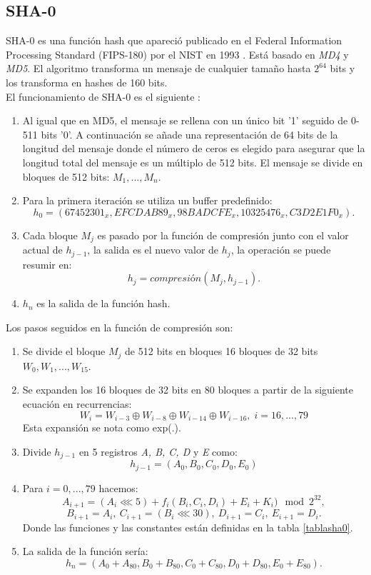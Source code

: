 \begin{aligned*}
\subsection{SHA-0}
SHA-0 es una función hash que apareció publicado en el Federal Information Processing Standard (FIPS-180) por el NIST en 1993 \cite{Penard2008}. Está basado en \emph{MD4} y \emph{MD5}. El algoritmo transforma un mensaje de cualquier tamaño hasta $2^{64}$ bits y los transforma en hashes de 160 bits.\\
El funcionamiento de SHA-0 es el siguiente \cite{sha0}:
\begin{enumerate}
	\item Al igual que en MD5, el mensaje se rellena con un único bit '1' seguido de 0-511 bits '0'. A continuación se añade una representación de 64 bits de la longitud del mensaje donde el número de ceros es elegido para asegurar que la longitud total del mensaje es un múltiplo de 512 bits. El mensaje se divide en bloques de 512 bits: $M_1,...,M_n$.
	\item Para la primera iteración se utiliza un buffer predefinido:
	$$
		h_0=(67452301_x, EFCDAB89_x, 98BADCFE_x, 10325476_x, C3D2E1F0_x).
	$$
	\item Cada bloque $M_j$ es pasado por la función de compresión junto con el valor actual de $h_{j-1}$, la salida es el nuevo valor de $h_j$, la operación se puede resumir en:
	$$
		h_j=compresión(M_j,h_{j-1}).
	$$
	\item $h_n$ es la salida de la función hash.
\end{enumerate}
Los pasos seguidos en la función de compresión son:
\begin{enumerate}
	\item Se divide el bloque $M_j$ de 512 bits en bloques 16 bloques de 32 bits $W_0,W_1,...,W_{15}$. 
	\item Se expanden los 16 bloques de 32 bits en 80 bloques a partir de la siguiente ecuación en recurrencias:
	$$
		W_i=W_{i-3}\oplus W_{i-8}\oplus W_{i-14}\oplus W_{i-16},\; i=16,...,79
	$$
	Esta expansión se nota como exp(.).
	\item Divide $h_{j-1}$ en 5 registros \emph{A, B, C, D} y \emph{E} como:
	$$
		h_{j-1} = (A_0, B_0, C_0, D_0, E_0)
	$$
	\item Para $i=0,...,79$ hacemos:
	$$
		A_{i+1}=(A_i\lll5)+f_i(B_i,C_i,D_i)+E_i+K_i) \mod 2^{32},
	$$
	$$
		B_{i+1}=A_i,\: C_{i+1}=(B_i\lll30),\: D_{i+1}=C_i,\: E_{i+1}=D_i.
	$$
	Donde las funciones y las constantes están definidas en la tabla \ref{tablasha0}.
	\item La salida de la función sería:
	$$
		h_n=(A_0+A_{80}, B_0+B_{80}, C_0+C_{80}, D_0+D_{80}, E_0+E_{80}).
	$$
\end{enumerate}


\end{aligned*}
